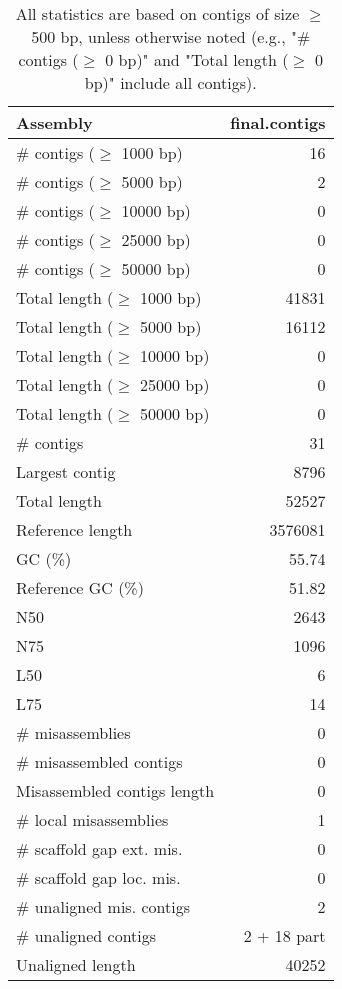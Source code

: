 \documentclass[12pt,a4paper]{article}
\begin{document}
\begin{table}[ht]
\begin{center}
\caption{All statistics are based on contigs of size $\geq$ 500 bp, unless otherwise noted (e.g., "\# contigs ($\geq$ 0 bp)" and "Total length ($\geq$ 0 bp)" include all contigs).}
\begin{tabular}{|l*{1}{|r}|}
\hline
Assembly & final.contigs \\ \hline
\# contigs ($\geq$ 1000 bp) & 16 \\ \hline
\# contigs ($\geq$ 5000 bp) & 2 \\ \hline
\# contigs ($\geq$ 10000 bp) & 0 \\ \hline
\# contigs ($\geq$ 25000 bp) & 0 \\ \hline
\# contigs ($\geq$ 50000 bp) & 0 \\ \hline
Total length ($\geq$ 1000 bp) & 41831 \\ \hline
Total length ($\geq$ 5000 bp) & 16112 \\ \hline
Total length ($\geq$ 10000 bp) & 0 \\ \hline
Total length ($\geq$ 25000 bp) & 0 \\ \hline
Total length ($\geq$ 50000 bp) & 0 \\ \hline
\# contigs & 31 \\ \hline
Largest contig & 8796 \\ \hline
Total length & 52527 \\ \hline
Reference length & 3576081 \\ \hline
GC (\%) & 55.74 \\ \hline
Reference GC (\%) & 51.82 \\ \hline
N50 & 2643 \\ \hline
N75 & 1096 \\ \hline
L50 & 6 \\ \hline
L75 & 14 \\ \hline
\# misassemblies & 0 \\ \hline
\# misassembled contigs & 0 \\ \hline
Misassembled contigs length & 0 \\ \hline
\# local misassemblies & 1 \\ \hline
\# scaffold gap ext. mis. & 0 \\ \hline
\# scaffold gap loc. mis. & 0 \\ \hline
\# unaligned mis. contigs & 2 \\ \hline
\# unaligned contigs & 2 + 18 part \\ \hline
Unaligned length & 40252 \\ \hline

\end{tabular}
\end{center}
\end{table}
\end{document}
